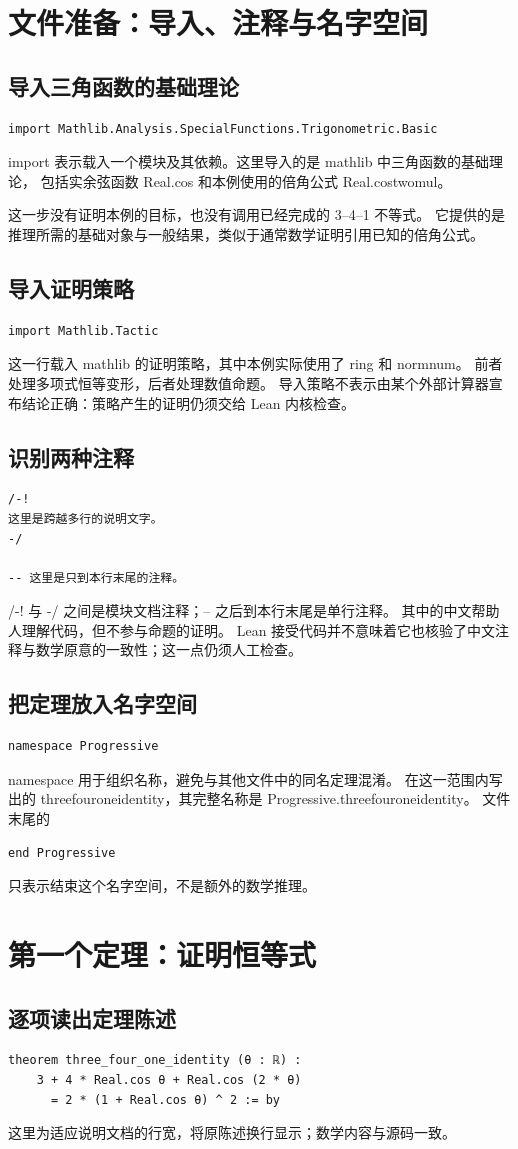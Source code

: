 \documentclass[UTF8,fontset=fandol,a4paper,11pt]{ctexart}
\newcommand{\code}[1]{{\small\ttfamily\def\_{\textunderscore\allowbreak}#1}}
\newcommand{\step}[1]{\Needspace{7\baselineskip}\subsection{#1}}
\begin{document}
\section{文件准备：导入、注释与名字空间}

\step{导入三角函数的基础理论}
\begin{Verbatim}
import Mathlib.Analysis.SpecialFunctions.Trigonometric.Basic
\end{Verbatim}
\code{import} 表示载入一个模块及其依赖。这里导入的是 mathlib 中三角函数的基础理论，
包括实余弦函数 \code{Real.cos} 和本例使用的倍角公式 \code{Real.cos\_two\_mul}。

这一步没有证明本例的目标，也没有调用已经完成的 3–4–1 不等式。
它提供的是推理所需的基础对象与一般结果，类似于通常数学证明引用已知的倍角公式。

\step{导入证明策略}
\begin{Verbatim}
import Mathlib.Tactic
\end{Verbatim}
这一行载入 mathlib 的证明策略，其中本例实际使用了 \code{ring} 和 \code{norm\_num}。
前者处理多项式恒等变形，后者处理数值命题。
导入策略不表示由某个外部计算器宣布结论正确：策略产生的证明仍须交给 Lean 内核检查。

\step{识别两种注释}
\begin{Verbatim}
/-!
这里是跨越多行的说明文字。
-/

-- 这里是只到本行末尾的注释。
\end{Verbatim}
\code{/-!} 与 \code{-/} 之间是模块文档注释；\code{--} 之后到本行末尾是单行注释。
其中的中文帮助人理解代码，但不参与命题的证明。
Lean 接受代码并不意味着它也核验了中文注释与数学原意的一致性；这一点仍须人工检查。

\step{把定理放入名字空间}
\begin{Verbatim}
namespace Progressive
\end{Verbatim}
\code{namespace} 用于组织名称，避免与其他文件中的同名定理混淆。
在这一范围内写出的 \code{three\_four\_one\_identity}，其完整名称是
\code{Progressive.three\_four\_one\_identity}。
文件末尾的
\begin{Verbatim}
end Progressive
\end{Verbatim}
只表示结束这个名字空间，不是额外的数学推理。

\section{第一个定理：证明恒等式}

\step{逐项读出定理陈述}
\begin{Verbatim}
theorem three_four_one_identity (θ : ℝ) :
    3 + 4 * Real.cos θ + Real.cos (2 * θ)
      = 2 * (1 + Real.cos θ) ^ 2 := by
\end{Verbatim}
这里为适应说明文档的行宽，将原陈述换行显示；数学内容与源码一致。
\end{document}
